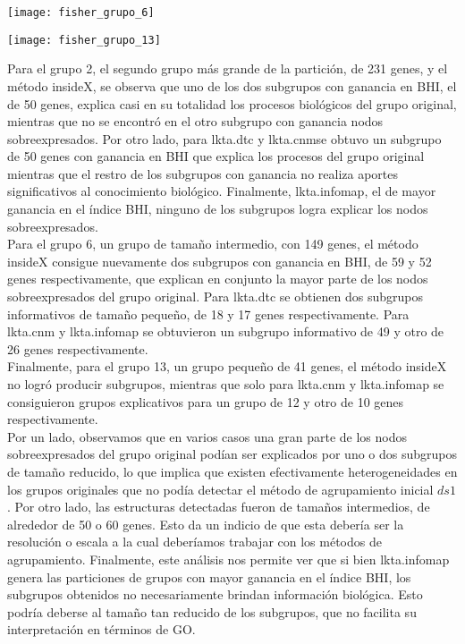 \begin{center}
\texttt{[image: fisher\_grupo\_6]}
\label{fig:fisher_grupo_6}
\end{center}

\begin{center}
\texttt{[image: fisher\_grupo\_13]}
\label{fig:fisher_grupo_13}
\end{center}


Para el grupo 2, el segundo grupo más grande de la partición, de 231 genes, y el método insideX, se observa que uno de los dos subgrupos con ganancia en BHI, el de 50 genes, explica casi en su totalidad los procesos biológicos del grupo original, mientras que no se encontró en el otro subgrupo con ganancia nodos sobreexpresados. Por otro lado, para lkta.dtc y lkta.cnmse obtuvo un subgrupo de 50 genes con ganancia en BHI que explica los procesos del grupo original mientras que el restro de los subgrupos con ganancia no realiza aportes significativos al conocimiento biológico. Finalmente, lkta.infomap, el de mayor ganancia en el índice BHI, ninguno de los subgrupos logra explicar los nodos sobreexpresados.\\
Para el grupo 6, un grupo de tamaño intermedio, con 149 genes, el método insideX consigue nuevamente dos subgrupos con ganancia en BHI, de 59 y 52 genes respectivamente, que explican en conjunto la mayor parte de los nodos sobreexpresados del grupo original. Para lkta.dtc se obtienen dos subgrupos informativos de tamaño pequeño, de 18 y 17 genes respectivamente. Para lkta.cnm y lkta.infomap se obtuvieron un subgrupo informativo de 49 y otro de 26 genes respectivamente.\\
Finalmente, para el grupo 13, un grupo pequeño de 41 genes, el método insideX no logró producir subgrupos, mientras que solo para lkta.cnm y lkta.infomap se consiguieron grupos explicativos para un grupo de 12 y otro de 10 genes respectivamente.\\
Por un lado, observamos que en varios casos una gran parte de los nodos sobreexpresados del grupo original podían ser explicados por uno o dos subgrupos de tamaño reducido, lo que implica que existen efectivamente heterogeneidades en los grupos originales que no podía detectar el método de agrupamiento inicial $ds1$. Por otro lado, las estructuras detectadas fueron de tamaños intermedios, de alrededor de 50 o 60 genes. Esto da un indicio de que esta debería ser la resolución o escala a la cual deberíamos trabajar con los métodos de agrupamiento. Finalmente, este análisis nos permite ver que si bien lkta.infomap genera las particiones de grupos con mayor ganancia en el índice BHI, los subgrupos obtenidos no necesariamente brindan información biológica. Esto podría deberse al tamaño tan reducido de los subgrupos, que no facilita su interpretación en términos de GO.





